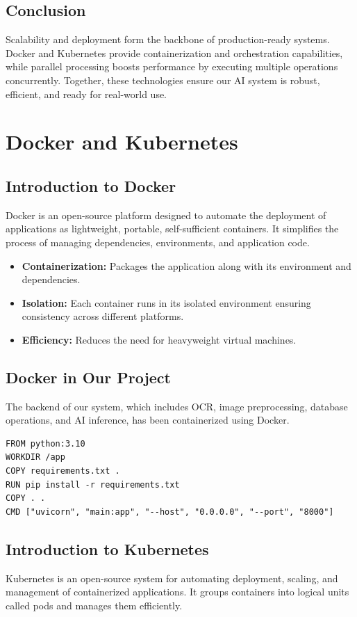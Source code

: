 \documentclass[12pt]{report}
\begin{document}
\subsection{Conclusion}
Scalability and deployment form the backbone of production-ready systems. Docker and Kubernetes provide containerization and orchestration capabilities, while parallel processing boosts performance by executing multiple operations concurrently. Together, these technologies ensure our AI system is robust, efficient, and ready for real-world use.
 
\section{Docker and Kubernetes}

\subsection{Introduction to Docker}
Docker is an open-source platform designed to automate the deployment of applications as lightweight, portable, self-sufficient containers. It simplifies the process of managing dependencies, environments, and application code.

\begin{itemize}
\item \textbf{Containerization:} Packages the application along with its environment and dependencies.
\item \textbf{Isolation:} Each container runs in its isolated environment ensuring consistency across different platforms.
\item \textbf{Efficiency:} Reduces the need for heavyweight virtual machines.
\end{itemize}

\subsection{Docker in Our Project}
The backend of our system, which includes OCR, image preprocessing, database operations, and AI inference, has been containerized using Docker.

\begin{verbatim}
FROM python:3.10
WORKDIR /app
COPY requirements.txt .
RUN pip install -r requirements.txt
COPY . .
CMD ["uvicorn", "main:app", "--host", "0.0.0.0", "--port", "8000"]
\end{verbatim}

\subsection{Introduction to Kubernetes}
Kubernetes is an open-source system for automating deployment, scaling, and management of containerized applications. It groups containers into logical units called pods and manages them efficiently.
\end{document}
